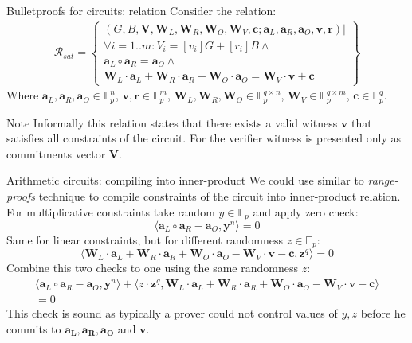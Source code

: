 \documentclass{zkdl-presentation-template}
\begin{document}
\begin{frame}{Bulletproofs for circuits: relation}
    Consider the relation:
    \begin{equation*}
        \begin{aligned}
            \mathcal{R}_{sat} = \left\{
                \begin{array}{l} 
                    (G, B, \mathbf{V}, \mathbf{W}_L, \mathbf{W}_R, \mathbf{W}_O, \mathbf{W}_V, \mathbf{c}; \mathbf{a}_L, \mathbf{a}_R, \mathbf{a}_O, \mathbf{v}, \mathbf{r}) | \\ 
                    \forall i=1..m: V_i = [v_i]G + [r_i]B \wedge \\
                    \mathbf{a}_L \circ \mathbf{a}_R = \mathbf{a}_O \wedge \\
                    \mathbf{W}_L \cdot \mathbf{a}_L + \mathbf{W}_R \cdot \mathbf{a}_R + \mathbf{W}_O \cdot \mathbf{a}_O = \mathbf{W}_V \cdot \mathbf{v} + \mathbf{c}
            \end{array}\right\}
        \end{aligned}
    \end{equation*}
    Where $\mathbf{a}_L, \mathbf{a}_R, \mathbf{a}_O \in \mathbb{F}_p^n$, $\mathbf{v}, \mathbf{r} \in \mathbb{F}_p^m$, $\mathbf{W}_L, \mathbf{W}_R, \mathbf{W}_O \in \mathbb{F}_p^{q \times n}$, $\mathbf{W}_V \in \mathbb{F}_p^{q \times m}$, $\mathbf{c} \in \mathbb{F}_p^q$.
    \begin{block}{Note}
        Informally this relation states that there exists a valid witness $\mathbf{v}$ that satisfies all constraints of the circuit. For the verifier witness is presented only as commitments vector $\mathbf{V}$.
    \end{block}
\end{frame}

\begin{frame}{Arithmetic circuits: compiling into inner-product}
We could use similar to \textit{range-proofs} technique to compile constraints of the circuit into inner-product relation. For multiplicative constraints take random $y \in \mathbb{F}_p$ and apply zero check:
$$ \langle \mathbf{a}_L \circ \mathbf{a}_R - \mathbf{a}_O, \mathbf{y}^n \rangle = 0$$
Same for linear constraints, but for different randomness $z \in \mathbb{F}_p$:
$$ \langle \mathbf{W}_L \cdot \mathbf{a}_L + \mathbf{W}_R \cdot \mathbf{a}_R + \mathbf{W}_O \cdot \mathbf{a}_O - \mathbf{W}_V \cdot \mathbf{v} - \mathbf{c}, \mathbf{z}^q \rangle = 0$$
Combine this two checks to one using the same randomness $z$:
\begin{equation*}
    \begin{aligned}
        \langle \mathbf{a}_L \circ \mathbf{a}_R - \mathbf{a}_O, \mathbf{y}^n \rangle + \langle z \cdot \mathbf{z}^q,  \mathbf{W}_L \cdot \mathbf{a}_L + \mathbf{W}_R \cdot \mathbf{a}_R + \mathbf{W}_O \cdot \mathbf{a}_O - \mathbf{W}_V \cdot \mathbf{v} - \mathbf{c} \rangle \\= 0
    \end{aligned}
\end{equation*}
This check is sound as typically a prover could not control values of $y,z$ before he commits to $\mathbf{a_L, a_R, a_O}$ and $\mathbf{v}$.
\end{frame}
\end{document}

